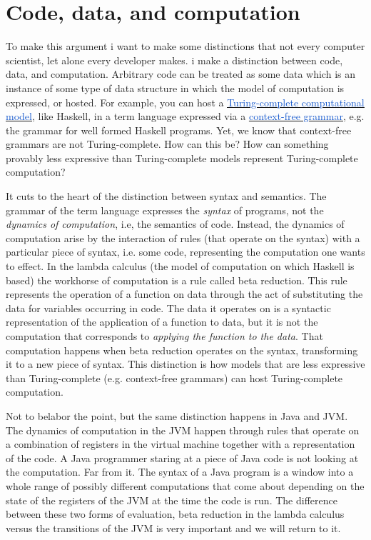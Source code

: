 \documentclass[runningheads]{llncs}
\begin{document}
\vspace{1\baselineskip}
\section{Code, data, and computation}

To make this argument i want to make some distinctions that not every computer scientist, let alone every developer makes. i make a distinction between code, data, and computation. Arbitrary code can be treated as some data which is an instance of some type of data structure in which the model of computation is expressed, or hosted. For example, you can host a \href{https://en.wikipedia.org/wiki/Turing_completeness}{\uline{\textcolor[HTML]{1155CC}{Turing-complete computational model}}}, like Haskell, in a term language expressed via a \href{https://en.wikipedia.org/wiki/Context-free_grammar}{\uline{\textcolor[HTML]{1155CC}{context-free grammar}}}, e.g. the grammar for well formed Haskell programs. Yet, we know that context-free grammars are not Turing-complete. How can this be? How can something provably less expressive than Turing-complete models represent Turing-complete computation?

\vspace{1\baselineskip}
It cuts to the heart of the distinction between syntax and semantics. The grammar of the term language expresses the \textit{syntax} of programs, not the \textit{dynamics of computation}, i.e, the semantics of code. Instead, the dynamics of computation arise by the interaction of rules (that operate on the syntax) with a particular piece of syntax, i.e. some code, representing the computation one wants to effect. In the lambda calculus (the model of computation on which Haskell is based) the workhorse of computation is a rule called beta reduction. This rule represents the operation of a function on data through the act of substituting the data for variables occurring in code. The data it operates on is a syntactic representation of the application of a function to data, but it is not the computation that corresponds to \textit{applying the function to the data}. That computation happens when beta reduction operates on the syntax, transforming it to a new piece of syntax. This distinction is how models that are less expressive than Turing-complete (e.g. context-free grammars) can host Turing-complete computation. 

\vspace{1\baselineskip}
Not to belabor the point, but the same distinction happens in Java and JVM. The dynamics of computation in the JVM happen through rules that operate on a combination of registers in the virtual machine together with a representation of the code. A Java programmer staring at a piece of Java code is not looking at the computation. Far from it. The syntax of a Java program is a window into a whole range of possibly different computations that come about depending on the state of the registers of the JVM at the time the code is run. The difference between these two forms of evaluation, beta reduction in the lambda calculus versus the transitions of the JVM is very important and we will return to it.
\end{document}
